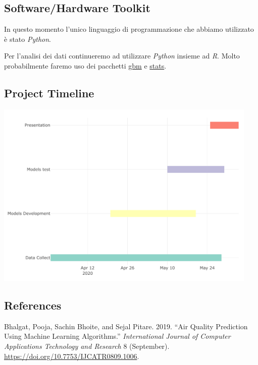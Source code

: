 \documentclass[
  12pt,
]{article}
\begin{document}
\hypertarget{softwarehardware-toolkit}{%
\subsection{Software/Hardware Toolkit}\label{softwarehardware-toolkit}}

In questo momento l'unico linguaggio di programmazione che abbiamo
utilizzato è stato \textit{Python}.

Per l'analisi dei dati continueremo ad utilizzare \textit{Python}
insieme ad \textit{R}. Molto probabilmente faremo uso dei pacchetti
\href{https://cran.r-project.org/web/packages/gbm/gbm.pdf}{gbm} e
\href{https://stat.ethz.ch/R-manual/R-devel/library/stats/html/stats-package.html}{stats}.

\hypertarget{project-timeline}{%
\subsection{Project Timeline}\label{project-timeline}}

\begin{center}
\includegraphics[height=9cm]{timeline.pdf}
\end{center}

\hypertarget{references}{%
\subsection*{References}\label{references}}

\hypertarget{refs}{}
\leavevmode\hypertarget{ref-article4}{}%
Bhalgat, Pooja, Sachin Bhoite, and Sejal Pitare. 2019. ``Air Quality
Prediction Using Machine Learning Algorithms.'' \emph{International
Journal of Computer Applications Technology and Research} 8 (September).
\url{https://doi.org/10.7753/IJCATR0809.1006}.
\end{document}
